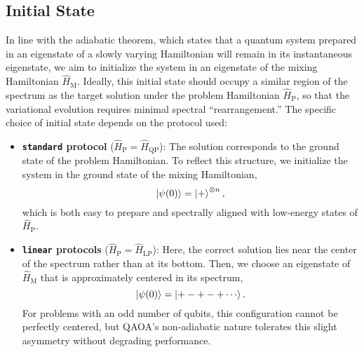 \subsection{Initial State}
\label{Section:InitialState}

In line with the adiabatic theorem, which states that a quantum system prepared in an eigenstate of a slowly varying Hamiltonian will remain in its instantaneous eigenstate, we aim to initialize the system in an eigenstate of the mixing Hamiltonian $\hat{H}_\mathrm{M}$. Ideally, this initial state should occupy a similar region of the spectrum as the target solution under the problem Hamiltonian $\hat{H}_\mathrm{P}$, so that the variational evolution requires minimal spectral “rearrangement.” The specific choice of initial state depends on the protocol used:

\begin{itemize}
    \item \textbf{\texttt{standard} protocol} ($\hat{H}_\mathrm{P} = \hat{H}_\mathrm{QP}$): The solution corresponds to the ground state of the problem Hamiltonian. To reflect this structure, we initialize the system in the ground state of the mixing Hamiltonian, $$\ket{\psi (0)} = \ket{+}^{\otimes n},$$ which is both easy to prepare and spectrally aligned with low-energy states of $\hat{H}_\mathrm{P}$.

    \item \textbf{\texttt{linear} protocols} ($\hat{H}_\mathrm{P} = \hat{H}_\mathrm{LP}$): Here, the correct solution lies near the center of the spectrum rather than at its bottom. Then, we choose an eigenstate of $\hat{H}_\mathrm{M}$ that is approximately centered in its spectrum, $$\ket{\psi (0)} = \ket{+-+-+\cdots}.$$ For problems with an odd number of qubits, this configuration cannot be perfectly centered, but QAOA's non-adiabatic nature tolerates this slight asymmetry without degrading performance.
\end{itemize}
